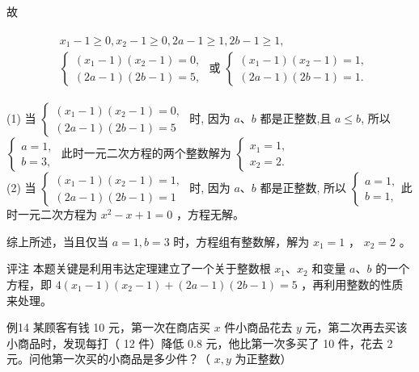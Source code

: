 \documentclass[10pt]{article}
\begin{document}
故

\begin{align*}
\begin{aligned}
& x_{1}-1 \geqslant 0, x_{2}-1 \geqslant 0,2 a-1 \geqslant 1,2 b-1 \geqslant 1, \\
& \left\{\begin{array} { l } 
{ ( x _ { 1 } - 1 ) ( x _ { 2 } - 1 ) = 0 , } \\
{ ( 2 a - 1 ) ( 2 b - 1 ) = 5 , }
\end{array} \text { 或 } \left\{\begin{array}{l}
\left(x_{1}-1\right)\left(x_{2}-1\right)=1, \\
(2 a-1)(2 b-1)=1 .
\end{array}\right.\right.
\end{aligned}
\end{align*}

(1) 当 $\left\{\begin{array}{l}\left(x_{1}-1\right)\left(x_{2}-1\right)=0, \\ (2 a-1)(2 b-1)=5\end{array}\right.$ 时, 因为 $a 、 b$ 都是正整数,且 $a \leqslant b$, 所以 $\left\{\begin{array}{l}a=1, \\ b=3,\end{array}\right.$ 此时一元二次方程的两个整数解为 $\left\{\begin{array}{l}x_{1}=1, \\ x_{2}=2 .\end{array}\right.$\\
(2) 当 $\left\{\begin{array}{l}\left(x_{1}-1\right)\left(x_{2}-1\right)=1, \\ (2 a-1)(2 b-1)=1\end{array}\right.$ 时, 因为 $a 、 b$ 都是正整数, 所以 $\left\{\begin{array}{l}a=1, \\ b=1,\end{array}\right.$此时一元二次方程为 $x^{2}-x+1=0$ ，方程无解。

综上所述，当且仅当 $a=1, b=3$ 时，方程组有整数解，解为 $x_{1}=1$ ， $x_{2}=2$ 。

评注 本题关键是利用韦达定理建立了一个关于整数根 $x_{1} 、 x_{2}$ 和变量 $a 、 b$ 的一个方程，即 $4\left(x_{1}-1\right)\left(x_{2}-1\right)+(2 a-1)(2 b-1)=5$ ，再利用整数的性质来处理。

例14 某顾客有钱 10 元，第一次在商店买 $x$ 件小商品花去 $y$ 元，第二次再去买该小商品时，发现每打（ 12 件）降低 0.8 元，他比第一次多买了 10 件，花去 2 元。问他第一次买的小商品是多少件？（ $x, y$ 为正整数）
\end{document}
